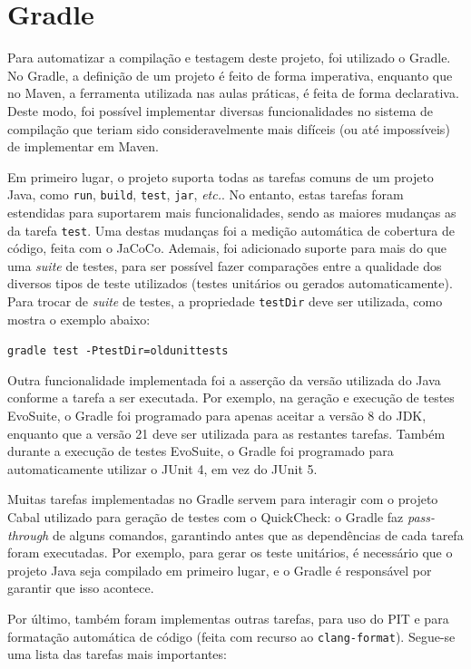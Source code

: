 \documentclass[12pt, a4paper]{article}
\begin{document}
\section{Gradle}

Para automatizar a compilação e testagem deste projeto, foi utilizado o Gradle. No Gradle, a
definição de um projeto é feito de forma imperativa, enquanto que no Maven, a ferramenta utilizada
nas aulas práticas, é feita de forma declarativa. Deste modo, foi possível implementar diversas
funcionalidades no sistema de compilação que teriam sido consideravelmente mais difíceis (ou até
impossíveis) de implementar em Maven.

Em primeiro lugar, o projeto suporta todas as tarefas comuns de um projeto Java, como \texttt{run},
\texttt{build}, \texttt{test}, \texttt{jar}, \emph{etc.}. No entanto, estas tarefas foram estendidas
para suportarem mais funcionalidades, sendo as maiores mudanças as da tarefa \texttt{test}. Uma
destas mudanças foi a medição automática de cobertura de código, feita com o JaCoCo. Ademais, foi
adicionado suporte para mais do que uma \emph{suite} de testes, para ser possível fazer comparações
entre a qualidade dos diversos tipos de teste utilizados (testes unitários ou gerados
automaticamente). Para trocar de \emph{suite} de testes, a propriedade \texttt{testDir} deve ser
utilizada, como mostra o exemplo abaixo:

\begin{center}
    \texttt{gradle test -PtestDir=oldunittests}
\end{center}

Outra funcionalidade implementada foi a asserção da versão utilizada do Java conforme a tarefa a
ser executada. Por exemplo, na geração e execução de testes EvoSuite, o Gradle foi programado para
apenas aceitar a versão 8 do JDK, enquanto que a versão 21 deve ser utilizada para as restantes
tarefas. Também durante a execução de testes EvoSuite, o Gradle foi programado para automaticamente
utilizar o JUnit 4, em vez do JUnit 5.

Muitas tarefas implementadas no Gradle servem para interagir com o projeto Cabal utilizado para
geração de testes com o QuickCheck: o Gradle faz \emph{pass-through} de alguns comandos, garantindo
antes que as dependências de cada tarefa foram executadas. Por exemplo, para gerar os teste
unitários, é necessário que o projeto Java seja compilado em primeiro lugar, e o Gradle é
responsável por garantir que isso acontece.

Por último, também foram implementas outras tarefas, para uso do PIT e para formatação automática
de código (feita com recurso ao \texttt{clang-format}). Segue-se uma lista das tarefas mais
importantes:
\end{document}

